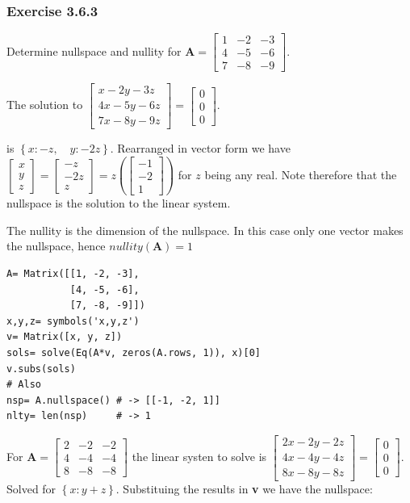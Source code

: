 \subsubsection{Exercise 3.6.3}
Determine nullspace and nullity for
$\mathbf{A} = \left[\begin{matrix}1 & -2 & -3\\4 & -5 & -6\\7 & -8 & -9\end{matrix}\right]$.

The solution to 
$\left[\begin{matrix}x - 2 y - 3 z\\4 x - 5 y - 6 z\\7 x - 8 y - 9 z\end{matrix}\right] =
\left[\begin{matrix}0\\0\\0\end{matrix}\right]$.

is $\left \{ x : - z, \quad y : - 2 z\right \}$. Rearranged in vector form we have
$\left[\begin{matrix}x\\y\\z\end{matrix}\right] =
\left[\begin{matrix}-z\\-2z\\z\end{matrix}\right] =
z(\left[\begin{matrix}-1\\-2\\1\end{matrix}\right])
$ for $z$ being any real. Note therefore that the nullspace is the solution to the
linear system.

The nullity is the dimension of the nullspace. In this case only one vector makes
the nullspace, hence $nullity(\mathbf{A}) = 1$

\begin{verbatim}
A= Matrix([[1, -2, -3],
           [4, -5, -6],
           [7, -8, -9]])
x,y,z= symbols('x,y,z')
v= Matrix([x, y, z])
sols= solve(Eq(A*v, zeros(A.rows, 1)), x)[0]
v.subs(sols)
# Also
nsp= A.nullspace() # -> [[-1, -2, 1]]
nlty= len(nsp)     # -> 1
\end{verbatim}

For $\mathbf{A} = \left[\begin{matrix}2 & -2 & -2\\4 & -4 & -4\\8 & -8 & -8\end{matrix}\right]$
the linear systen to solve is
$\left[\begin{matrix}2 x - 2 y - 2 z\\4 x - 4 y - 4 z\\8 x - 8 y - 8 z\end{matrix}\right] =
\left[\begin{matrix}0\\0\\0\end{matrix}\right]$. Solved for $\left \{ x : y + z\right \}$.
Substituing the results in \textbf{v} we have the nullspace:

